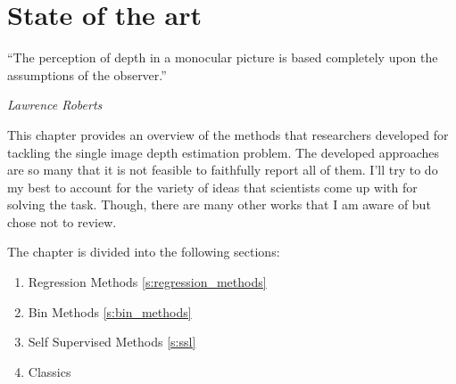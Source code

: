 \chapter{State of the art}
\label{c:sota}

\epigraph{\enquote{The perception of depth in a monocular picture is based completely upon the assumptions of the observer.}}{\emph{Lawrence Roberts}}

This chapter provides an overview of the methods that researchers developed for tackling the single image depth estimation problem.
The developed approaches are so many that it is not feasible to faithfully report all of them.
I'll try to do my best to account for the variety of ideas that scientists come up with for solving the task.
Though, there are many other works that I am aware of but chose not to review.

The chapter is divided into the following sections:
\begin{enumerate}
    \item{Regression Methods \ref{s:regression_methods}}
    \item{Bin Methods \ref{s:bin_methods}}
    \item{Self Supervised Methods \ref{s:ssl}}
    \item{Classics}
\end{enumerate}

%





%